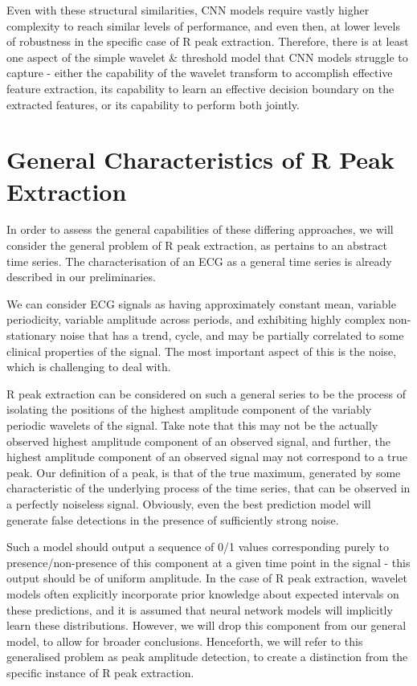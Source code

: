 \documentclass[9pt,conference]{IEEEtran}
\begin{document}
Even with these structural similarities, CNN models require vastly higher complexity to reach similar levels of performance, and even then, at lower levels of robustness in the specific case of R peak extraction. Therefore, there is at least one aspect of the simple wavelet \& threshold model that CNN models struggle to capture - either the capability of the wavelet transform to accomplish effective feature extraction, its capability to learn an effective decision boundary on the extracted features, or its capability to perform both jointly.

\section{General Characteristics of R Peak Extraction}
In order to assess the general capabilities of these differing approaches, we will consider the general problem of R peak extraction, as pertains to an abstract time series. The characterisation of an ECG as a general time series is already described in our preliminaries.

We can consider ECG signals as having approximately constant mean, variable periodicity, variable amplitude across periods, and exhibiting highly complex non-stationary noise that has a trend, cycle, and may be partially correlated to some clinical properties of the signal. The most important aspect of this is the noise, which is challenging to deal with.

R peak extraction can be considered on such a general series to be the process of isolating the positions of the highest amplitude component of the variably periodic wavelets of the signal. Take note that this may not be the actually observed highest amplitude component of an observed signal, and further, the highest amplitude component of an observed signal may not correspond to a true peak. Our definition of a peak, is that of the true maximum, generated by some characteristic of the underlying process of the time series, that can be observed in a perfectly noiseless signal. Obviously, even the best prediction model will generate false detections in the presence of sufficiently strong noise.

Such a model should output a sequence of 0/1 values corresponding purely to presence/non-presence of this component at a given time point in the signal - this output should be of uniform amplitude. In the case of R peak extraction, wavelet models often explicitly incorporate prior knowledge about expected intervals on these predictions, and it is assumed that neural network models will implicitly learn these distributions. However, we will drop this component from our general model, to allow for broader conclusions. Henceforth, we will refer to this generalised problem as peak amplitude detection, to create a distinction from the specific instance of R peak extraction. 
\end{document}
